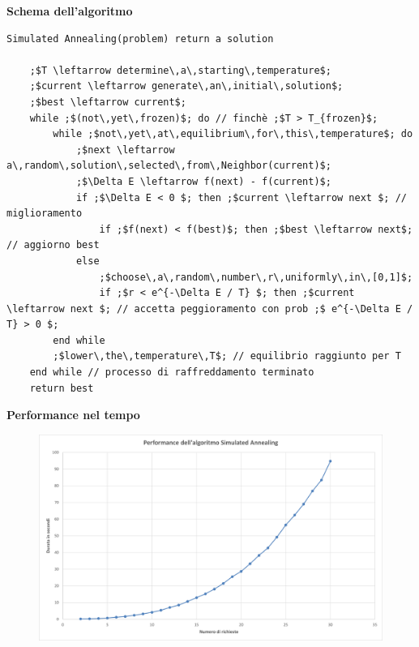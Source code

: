 \documentclass[9pt]{beamer}
\begin{document}
\begin{frame}{\subsecname}
\framebreak

	\textbf{Schema dell'algoritmo}
\begin{verbatim}
Simulated Annealing(problem) return a solution

	;$T \leftarrow determine\,a\,starting\,temperature$;
	;$current \leftarrow generate\,an\,initial\,solution$;
	;$best \leftarrow current$;
	while ;$(not\,yet\,frozen)$; do // finchè ;$T > T_{frozen}$;
		while ;$not\,yet\,at\,equilibrium\,for\,this\,temperature$; do
			;$next \leftarrow a\,random\,solution\,selected\,from\,Neighbor(current)$;
			;$\Delta E \leftarrow f(next) - f(current)$;
			if ;$\Delta E < 0 $; then ;$current \leftarrow next $; // miglioramento
				if ;$f(next) < f(best)$; then ;$best \leftarrow next$; // aggiorno best
			else
				;$choose\,a\,random\,number\,r\,uniformly\,in\,[0,1]$;
				if ;$r < e^{-\Delta E / T} $; then ;$current \leftarrow next $; // accetta peggioramento con prob ;$ e^{-\Delta E / T} > 0 $;
		end while
		;$lower\,the\,temperature\,T$; // equilibrio raggiunto per T
	end while // processo di raffreddamento terminato
	return best
\end{verbatim}

\framebreak
	\textbf{Performance nel tempo}
      	\begin{figure}[h]
	\centering
	\includegraphics[width=\textwidth]
	{../charts/11 Performance dell'algoritmo Simulated Annealing}
	\end{figure}
\end{frame}

\end{document}
